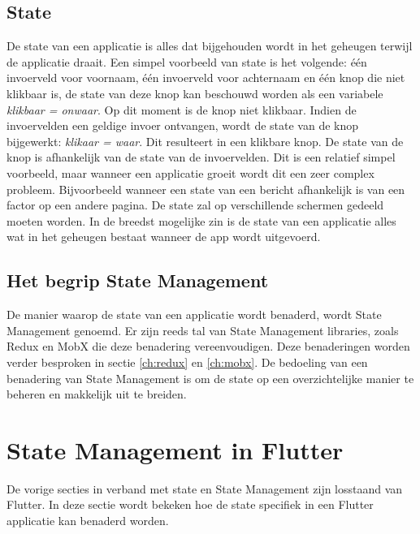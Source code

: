 \subsection{State}
\label{ch:state}
De state van een applicatie is alles dat bijgehouden wordt in het geheugen terwijl de applicatie draait. \autocite{Coninck2019}
Een simpel voorbeeld van state is het volgende: één invoerveld voor voornaam, één invoerveld voor achternaam en één knop die niet klikbaar is, de state van deze knop kan beschouwd worden als een variabele \textit{klikbaar = onwaar}. Op dit moment is de knop niet klikbaar. Indien de invoervelden een geldige invoer ontvangen, wordt de state van de knop bijgewerkt: \textit{klikaar = waar}. Dit resulteert in een klikbare knop. De state van de knop is afhankelijk van de state van de invoervelden. Dit is een relatief simpel voorbeeld, maar wanneer een applicatie groeit wordt dit een zeer complex probleem. Bijvoorbeeld wanneer een state van een bericht afhankelijk is van een factor op een andere pagina. De state zal op verschillende schermen gedeeld moeten worden.
In de breedst mogelijke zin is de state van een applicatie alles wat in het geheugen bestaat wanneer de app wordt uitgevoerd. 

\subsection{Het begrip State Management}
De manier waarop de state van een applicatie wordt benaderd, wordt State Management genoemd. Er zijn reeds tal van State Management libraries, zoals Redux en MobX die deze benadering vereenvoudigen. Deze benaderingen worden verder besproken in sectie \ref{ch:redux} en \ref{ch:mobx}. De bedoeling van een benadering van State Management is om de state op een overzichtelijke manier te beheren en makkelijk uit te breiden.

\section{State Management in Flutter}
De vorige secties in verband met state en State Management zijn losstaand van Flutter. In deze sectie wordt bekeken hoe de state specifiek in een Flutter applicatie kan benaderd worden.

